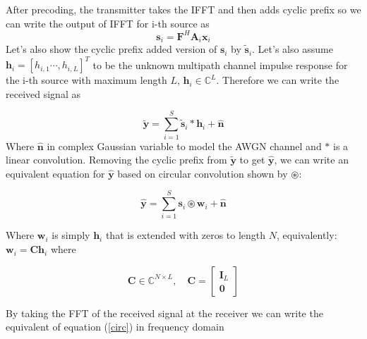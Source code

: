 After precoding, the transmitter takes the IFFT and then adds cyclic prefix
so we can write the output of IFFT for i-th source as $$\mathbf{s}_i  = \mathbf{F}^H\mathbf{A}_i\mathbf{x}_i$$
Let's also show the cyclic prefix added version of $\mathbf{s}_i$ by $\tilde{\mathbf{s}}_i$.
Let's also assume $\mathbf{h}_i = [h_{i,1}\cdots, h_{i,L} ]^T$ to be the unknown multipath channel impulse response for the i-th source with maximum length $L$, $\mathbf{h}_i \in \mathbb{C}^L$.
Therefore we can write the received signal as 

\begin{equation}
\tilde{\mathbf{{y}}} = \sum_{i=1}^{S} \tilde{\mathbf{s}}_i \ast \mathbf{h}_i + \hat{\mathbf{n}}
\end{equation}
Where $\hat{\mathbf{n}}$ in complex Gaussian variable to model the AWGN channel and $\ast$ is a linear convolution. Removing the cyclic prefix
from $\tilde{\mathbf{{y}}}$ to get $\hat{\mathbf{y}}$, we can write an equivalent equation for $\hat{\mathbf{y}}$ based on circular convolution shown by $ \circledast$: 

\begin{equation}
\label{circ}
\hat{\mathbf{y}} =  \sum_{i=1}^{S} \mathbf{s}_i \circledast \mathbf{w}_i + \hat{\mathbf{n}}
\end{equation}

Where $\mathbf{w}_i$ is simply $\mathbf{h}_i$ that is extended with zeros to length $N$, equivalently: 
$\mathbf{w}_i = \mathbf{C}\mathbf{h}_i$ where 


\begin{equation}
\label{real}
\mathbf{C} \in  \mathbb{C} ^{N \times L},  \quad \mathbf{C} =
\begin{bmatrix}
\mathbf{I}_L\\
\mathbf{0}
\end{bmatrix} 
\end{equation}

By taking the FFT of the received signal at the receiver we can write the equivalent of equation (\ref{circ}) in frequency domain

